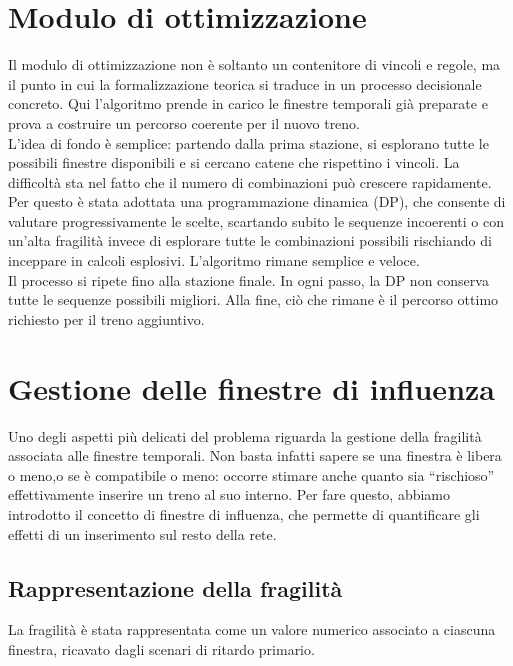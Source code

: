 \documentclass[a4paper,12pt]{report}
\begin{document}
\section{Modulo di ottimizzazione}
Il modulo di ottimizzazione non è soltanto un contenitore di vincoli e regole, ma il punto in cui la formalizzazione teorica si traduce in un processo decisionale concreto. Qui l’algoritmo prende in carico le finestre temporali già preparate e prova a costruire un percorso coerente per il nuovo treno. \\ 
L’idea di fondo è semplice: partendo dalla prima stazione, si esplorano tutte le possibili finestre disponibili e si cercano catene che rispettino i vincoli. La difficoltà sta nel fatto che il numero di combinazioni può crescere rapidamente. Per questo è stata adottata una programmazione dinamica (DP), che consente di valutare progressivamente le scelte, scartando subito le sequenze incoerenti o con un'alta fragilità invece di esplorare tutte le combinazioni possibili rischiando di inceppare in calcoli esplosivi. L’algoritmo rimane semplice e veloce. \\
Il processo si ripete fino alla stazione finale. In ogni passo, la DP non conserva tutte le sequenze possibili migliori. Alla fine, ciò che rimane è il percorso ottimo richiesto per il treno aggiuntivo.


\section{Gestione delle finestre di influenza}

Uno degli aspetti più delicati del problema riguarda la gestione della fragilità associata alle finestre temporali. Non basta infatti sapere se una finestra è libera o meno,o se è compatibile o meno: occorre stimare anche quanto sia “rischioso” effettivamente inserire un treno al suo interno. Per fare questo, abbiamo introdotto il concetto di finestre di influenza, che permette di quantificare gli effetti di un inserimento sul resto della rete.
\subsection{Rappresentazione della fragilità}
La fragilità è stata rappresentata come un valore numerico associato a ciascuna finestra, ricavato dagli scenari di ritardo primario.
\end{document}

